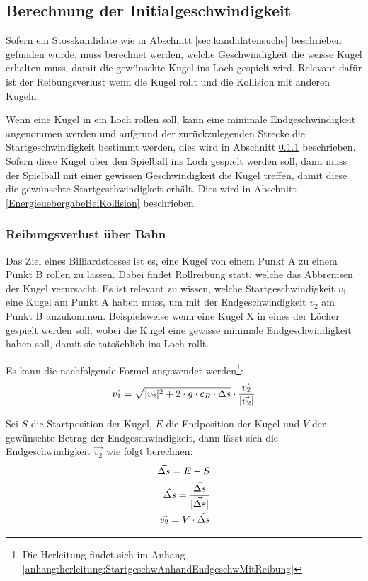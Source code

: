 \subsection{Berechnung der Initialgeschwindigkeit}\label{sec:initialgeschwindigkeit}
Sofern ein Stosskandidate wie in Abschnitt \ref{sec:kandidatensuche} beschrieben gefunden wurde, muss berechnet werden,
welche Geschwindigkeit die weisse Kugel erhalten muss, damit die gewünschte Kugel ins Loch gespielt wird.
Relevant dafür ist der Reibungsverlust wenn die Kugel rollt und die Kollision mit anderen Kugeln.

Wenn eine Kugel in ein Loch rollen soll, kann eine minimale Endgeschwindigkeit angenommen werden und aufgrund
der zurückzulegenden Strecke die Startgeschwindigkeit bestimmt werden, dies wird in Abschnitt \ref{ReibungsverlustUeberBahn} beschrieben.
Sofern diese Kugel über den Spielball ins Loch gespielt werden soll, dann muss der Spielball mit einer gewissen
Geschwindigkeit die Kugel treffen, damit diese die gewünschte Startgeschwindigkeit erhält. Dies wird in Abschnitt \ref{EnergieuebergabeBeiKollision} beschrieben.

\subsubsection{Reibungsverlust über Bahn}\label{ReibungsverlustUeberBahn}
Das Ziel eines Billiardstosses ist es, eine Kugel von einem Punkt A zu einem Punkt B rollen zu lassen.
Dabei findet Rollreibung statt, welche das Abbremsen der Kugel verursacht.
Es ist relevant zu wissen, welche Startgeschwindigkeit $v_1$ eine Kugel am Punkt A haben muss,
um mit der Endgeschwindigkeit $v_2$ am Punkt B anzukommen.
Beispielsweise wenn eine Kugel X in eines der Löcher gespielt werden soll,
wobei die Kugel eine gewisse minimale Endgeschwindigkeit haben soll, damit sie tatsächlich ins Loch rollt.

Es kann die nachfolgende Formel angewendet werden\footnote{Die Herleitung findet sich im Anhang \ref{anhang:herleitung:StartgeschwAnhandEndgeschwMitReibung}}:
\begin{align}
    \vec{v_1} = \sqrt{\lvert \vec{v_2} \rvert^2 + 2 \cdot g \cdot c_R \cdot \Delta s} \cdot \frac{\vec{v_2}}{\lvert \vec{v_2} \rvert}
\end{align}

Sei $S$ die Startposition der Kugel, $E$ die Endposition der Kugel und $V$ der gewünschte Betrag der Endgeschwindigkeit,
dann lässt sich die Endgeschwindigkeit $\vec{v_2}$ wie folgt berechnen:
\begin{align}
    \vec{\Delta s} = E - S\\
    \hat{\Delta s} = \frac{\vec{\Delta s}}{\lvert \vec{\Delta s} \rvert}\\
    \vec{v_2} = V \cdot \hat{\Delta s}
\end{align}

